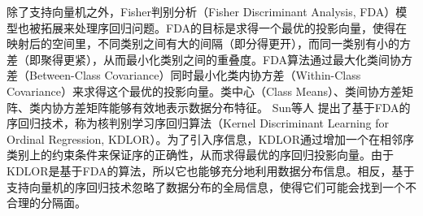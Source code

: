 
除了支持向量机之外，Fisher判别分析（Fisher Discriminant Analysis, FDA\citep{scholkopft1999fisher}）模型也被拓展来处理序回归问题。FDA的目标是求得一个最优的投影向量，使得在映射后的空间里，不同类别之间有大的间隔（即分得更开），而同一类别有小的方差（即聚得更紧），从而最小化类别之间的重叠度。FDA算法通过最大化类间协方差（Between-Class Covariance）同时最小化类内协方差（Within-Class Covariance）来求得这个最优的投影向量。类中心（Class Means）、类间协方差矩阵、类内协方差矩阵能够有效地表示数据分布特征。
Sun等人\citep{sun2010kernel}
提出了基于FDA的序回归技术，称为核判别学习序回归算法（Kernel Discriminant Learning for Ordinal Regression, KDLOR）。为了引入序信息，KDLOR通过增加一个在相邻序类别上的约束条件来保证序的正确性，从而求得最优的序回归投影向量。由于KDLOR是基于FDA的算法，所以它也能够充分地利用数据分布信息。相反，基于支持向量机的序回归技术忽略了数据分布的全局信息，使得它们可能会找到一个不合理的分隔面\citep{sun2010kernel}。


